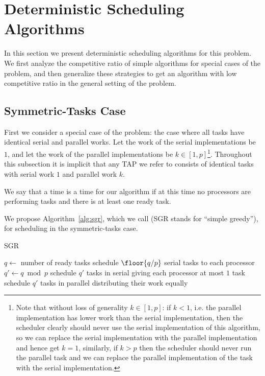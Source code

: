
\section{Deterministic Scheduling Algorithms}
In this section we present deterministic scheduling algorithms
for this problem. We first analyze the competitive ratio of
simple algorithms for special cases of the problem, and then
generalize these strategies to get an algorithm with low
competitive ratio in the general setting of the problem.

\subsection{Symmetric-Tasks Case}
\label{subsec:symmetrictasks}

First we consider a special case of the problem: the case where
all tasks have identical serial and parallel works. Let
the work of the serial implementations be $1$, and let the work
of the parallel implementations be $k \in [1, p]$\footnote{Note that
without loss of generality $k \in [1,p]$: if $k < 1$, i.e. the
parallel implementation has lower work than the serial
implementation, then the scheduler clearly should never use the serial
implementation of this algorithm, so we can replace the serial
implementation with the parallel implementation and hence get
$k=1$, similarly, if $k > p$ then the scheduler should never run
the parallel task and we can replace the parallel implementation
of the task with the serial implementation.}. Throughout this
subsection it is implicit that any TAP we
refer to consists of identical tasks with serial work $1$ and parallel work $k$.

We say that a time is a  time for our algorithm if at
this time no processors are performing tasks and there is at
least one ready task.

We propose Algorithm~\ref{alg:sgr}, which we call 
(SGR stands for \enquote{simple greedy}),
for scheduling in the symmetric-tasks case.

\begin{algorithm}
  \caption{SGR}
  \label{alg:sgr}
  \begin{algorithmic}
        \State $q \gets $ number of ready tasks
        \State schedule $\floor{q/p}$ serial tasks to each processor
        \State $q' \gets q\bmod p$
          \State schedule $q'$ tasks in serial
          \State giving each processor at most $1$ task
        \Else
          \State schedule $q'$ tasks in parallel
          \State distributing their work equally 
        \EndIf
      \EndIf
    \EndWhile
  \end{algorithmic}
\end{algorithm}

